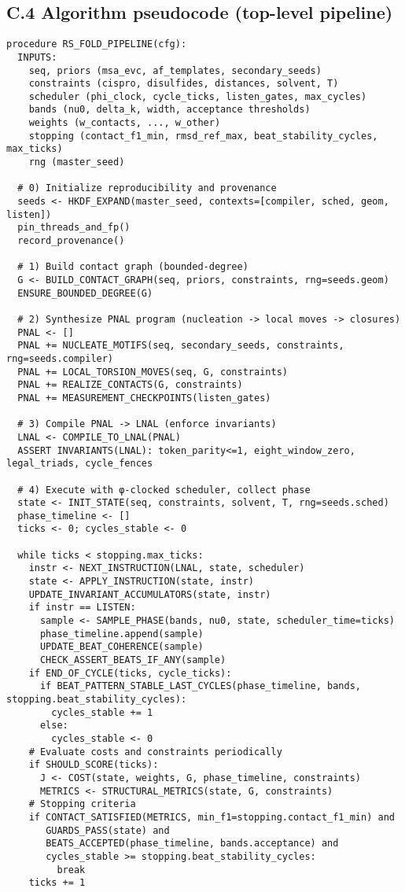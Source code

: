\documentclass[12pt,a4paper]{article}
\begin{document}
\subsection*{C.4 Algorithm pseudocode (top-level pipeline)}
\begin{verbatim}
procedure RS_FOLD_PIPELINE(cfg):
  INPUTS:
    seq, priors (msa_evc, af_templates, secondary_seeds)
    constraints (cispro, disulfides, distances, solvent, T)
    scheduler (phi_clock, cycle_ticks, listen_gates, max_cycles)
    bands (nu0, delta_k, width, acceptance thresholds)
    weights (w_contacts, ..., w_other)
    stopping (contact_f1_min, rmsd_ref_max, beat_stability_cycles, max_ticks)
    rng (master_seed)

  # 0) Initialize reproducibility and provenance
  seeds <- HKDF_EXPAND(master_seed, contexts=[compiler, sched, geom, listen])
  pin_threads_and_fp()
  record_provenance()

  # 1) Build contact graph (bounded-degree)
  G <- BUILD_CONTACT_GRAPH(seq, priors, constraints, rng=seeds.geom)
  ENSURE_BOUNDED_DEGREE(G)

  # 2) Synthesize PNAL program (nucleation -> local moves -> closures)
  PNAL <- []
  PNAL += NUCLEATE_MOTIFS(seq, secondary_seeds, constraints, rng=seeds.compiler)
  PNAL += LOCAL_TORSION_MOVES(seq, G, constraints)
  PNAL += REALIZE_CONTACTS(G, constraints)
  PNAL += MEASUREMENT_CHECKPOINTS(listen_gates)

  # 3) Compile PNAL -> LNAL (enforce invariants)
  LNAL <- COMPILE_TO_LNAL(PNAL)
  ASSERT INVARIANTS(LNAL): token_parity<=1, eight_window_zero, legal_triads, cycle_fences

  # 4) Execute with φ-clocked scheduler, collect phase
  state <- INIT_STATE(seq, constraints, solvent, T, rng=seeds.sched)
  phase_timeline <- []
  ticks <- 0; cycles_stable <- 0

  while ticks < stopping.max_ticks:
    instr <- NEXT_INSTRUCTION(LNAL, state, scheduler)
    state <- APPLY_INSTRUCTION(state, instr)
    UPDATE_INVARIANT_ACCUMULATORS(state, instr)
    if instr == LISTEN:
      sample <- SAMPLE_PHASE(bands, nu0, state, scheduler_time=ticks)
      phase_timeline.append(sample)
      UPDATE_BEAT_COHERENCE(sample)
      CHECK_ASSERT_BEATS_IF_ANY(sample)
    if END_OF_CYCLE(ticks, cycle_ticks):
      if BEAT_PATTERN_STABLE_LAST_CYCLES(phase_timeline, bands, stopping.beat_stability_cycles):
        cycles_stable += 1
      else:
        cycles_stable <- 0
    # Evaluate costs and constraints periodically
    if SHOULD_SCORE(ticks):
      J <- COST(state, weights, G, phase_timeline, constraints)
      METRICS <- STRUCTURAL_METRICS(state, G, constraints)
    # Stopping criteria
    if CONTACT_SATISFIED(METRICS, min_f1=stopping.contact_f1_min) and
       GUARDS_PASS(state) and
       BEATS_ACCEPTED(phase_timeline, bands.acceptance) and
       cycles_stable >= stopping.beat_stability_cycles:
         break
    ticks += 1


\end{verbatim}
\end{document}
